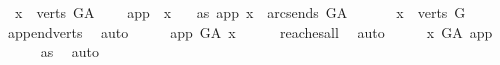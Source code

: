 \begin{isabellebody}
\ \ {\isachardoublequoteopen}x\ {\isasymin}\ verts\ G{\isacharunderscore}{\kern0pt}A{\isachardoublequoteclose}\isanewline
\ \ \ \ {\isachardoublequoteopen}app\ {\isasymnoteq}\ x{\isachardoublequoteclose}\isanewline
\ \ \ as{\isacharcolon}{\kern0pt}\ {\isachardoublequoteopen}{\isacharparenleft}{\kern0pt}app{\isacharcomma}{\kern0pt}\ x{\isacharparenright}{\kern0pt}\ {\isasymnotin}\ {\isacharparenleft}{\kern0pt}arcs{\isacharunderscore}{\kern0pt}ends\ G{\isacharunderscore}{\kern0pt}A{\isacharparenright}{\kern0pt}\isactrlsup {\isacharplus}{\kern0pt}\ {\isachardoublequoteclose}\isanewline
\ \ \isamarkupfalse%
\ \isamarkupfalse%
\ {\isachardoublequoteopen}x\ {\isasymin}\ verts\ G{\isachardoublequoteclose}\ \isanewline
\ \ \ \ \isamarkupfalse%
\ append{\isacharunderscore}{\kern0pt}verts\ \isamarkupfalse%
\ auto\isanewline
\ \ \isamarkupfalse%
\ \isamarkupfalse%
\ {\isachardoublequoteopen}app\ {\isasymrightarrow}\isactrlsup {\isacharplus}{\kern0pt}\isactrlbsub G{\isacharunderscore}{\kern0pt}A\isactrlesub \ x{\isachardoublequoteclose}\isanewline
\ \ \ \ \isamarkupfalse%
\ reaches{\isacharunderscore}{\kern0pt}all\ \isamarkupfalse%
\ auto\isanewline
\ \ \isamarkupfalse%
\ \isamarkupfalse%
\ {\isachardoublequoteopen}x\ {\isasymrightarrow}\isactrlsup {\isacharplus}{\kern0pt}\isactrlbsub G{\isacharunderscore}{\kern0pt}A\isactrlesub \ app{\isachardoublequoteclose}\ \isanewline
\ \ \ \ \isamarkupfalse%
\ as\ \isamarkupfalse%
\ auto\isanewline
{}\isamarkupfalse%
%
\endisatagproof
{\isafoldproof}%
%
\isadelimproof
\isanewline
%
\endisadelimproof
%
\isadelimtheory
%
\endisadelimtheory
%
\isatagtheory
{}\isamarkupfalse%
%
\endisatagtheory
{\isafoldtheory}%
%
\isadelimtheory
%
\endisadelimtheory
%
\end{isabellebody}%
\endinput
